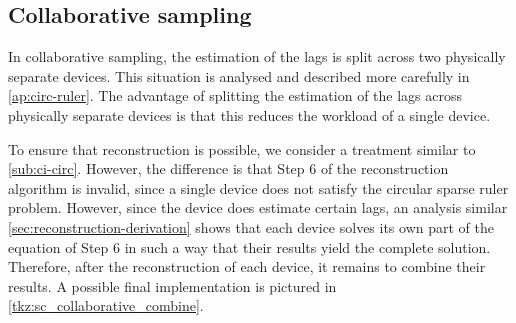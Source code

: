 \documentclass[a4paper, openany, oneside]{memoir}
\begin{document}
\subsection{Collaborative sampling}
In collaborative sampling, the estimation of the lags is split across two physically separate devices. This situation is analysed and described more carefully in \cref{ap:circ-ruler}. The advantage of splitting the estimation of the lags across physically separate devices is that this reduces the workload of a single device. 

To ensure that reconstruction is possible, we consider a treatment similar to \cref{sub:ci-circ}. However, the difference is that Step 6 of the reconstruction algorithm is invalid, since a single device does not satisfy the circular sparse ruler problem. However, since the device does estimate certain lags, an analysis similar \cref{sec:reconstruction-derivation} shows that each device solves its own part of the equation of Step 6 in such a way that their results yield the complete solution. Therefore, after the reconstruction of each device, it remains to combine their results. A possible final implementation is pictured in \cref{tkz:sc_collaborative_combine}.
\end{document}
